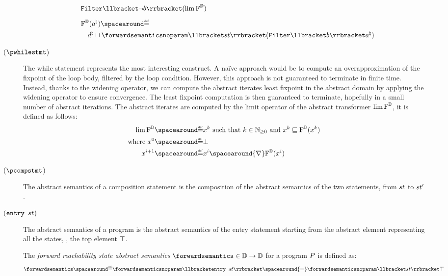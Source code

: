 \begin{description}
{\begin{align*}
      &\quad \abstractdomainfilter \semanticsof{\neg\defbexp} (\lim \abstractdomaintransformer) \\[5pt]
      &\quad \abstractdomaintransformer (\defotherabstractvalue) \DefeQ \\
      &\qquad\defabstractvalue \abstractdomainjoin \forwardsemanticsnoparam \semanticsof{\defstmt}(\abstractdomainfilter \semanticsof{\defbexp}\defotherabstractvalue)
    \end{align*}
  }
  \item[\normalfont ($\pwhilestmt$)] The while statement represents the most interesting construct. A na\"ive approach would be to compute an overapproximation of the fixpoint of the loop body, filtered by the loop condition. However, this approach is not guaranteed to terminate in finite time. Instead, thanks to the widening operator, we can compute the abstract iterates least fixpoint in the abstract domain by applying the widening operator to ensure convergence. The least fixpoint computation is then guaranteed to terminate, hopefully in a small number of abstract iterations.
  The abstract iterates are computed by the limit operator of the abstract transformer $\lim \textup{F}^{\mathbb{D}}$, it is defined as follows:
  \begin{align*}
    \lim \abstractdomaintransformer &\DefeQ x^k \text{ such that } k\in\Npos \text{ and } x^k \abstractdomainsubseteq \abstractdomaintransformer(x^k) \\
    \text{where } x^0 &\DefeQ \abstractdomainbottom \\
    x^{i+1} &\DefeQ x^i \spacearound{\abstractdomainwidening} \abstractdomaintransformer(x^i)
  \end{align*}
  \item[\normalfont ($\pcompstmt$)] The abstract semantics of a composition statement is the composition of the abstract semantics of the two statements, from $st$ to $st'$.
  \item[\normalfont ($\textup{\texttt{entry }} st$)] The abstract semantics of a program is the abstract semantics of the entry statement starting from the abstract element representing all the states, \ie, the top element $\top$.
    \begin{definition}
      The \emph{forward reachability state abstract semantics} $\forwardsemantics\in\forwardtype$ for a program $P$ is defined as:
      \begin{align*}
        \forwardsemantics \DefeQ \forwardsemanticsnoparam \semanticsof{\progstmt} \spacearound{=} \forwardsemanticsnoparam \semanticsof{\defstmt}\abstractdomaintop
      \end{align*}
    \end{definition}
\end{description}

